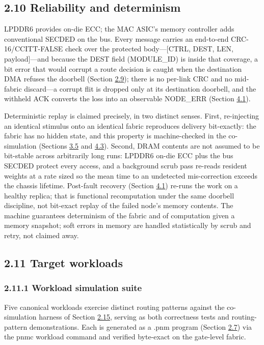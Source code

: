 \documentclass[10pt,twocolumn]{article}
\begin{document}
\subsection*{2.10 Reliability and determinism}\label{sec:2.10}

LPDDR6 provides on-die ECC; the MAC ASIC's memory controller adds conventional SECDED on the bus. Every message carries an end-to-end CRC-16/CCITT-FALSE check over the protected body---[CTRL, DEST, LEN, payload]---and because the DEST field (MODULE\_ID) is inside that coverage, a bit error that would corrupt a route decision is caught when the destination DMA refuses the doorbell (Section \hyperref[sec:2.9]{2.9}); there is no per-link CRC and no mid-fabric discard---a corrupt flit is dropped only at its destination doorbell, and the withheld ACK converts the loss into an observable NODE\_ERR (Section \hyperref[sec:4.1]{4.1}).

Deterministic replay is claimed precisely, in two distinct senses. First, re-injecting an identical stimulus onto an identical fabric reproduces delivery bit-exactly: the fabric has no hidden state, and this property is machine-checked in the co-simulation (Sections \hyperref[sec:3.5]{3.5} and \hyperref[sec:4.3]{4.3}). Second, DRAM contents are not assumed to be bit-stable across arbitrarily long runs: LPDDR6 on-die ECC plus the bus SECDED protect every access, and a background scrub pass re-reads resident weights at a rate sized so the mean time to an undetected mis-correction exceeds the chassis lifetime. Post-fault recovery (Section \hyperref[sec:4.1]{4.1}) re-runs the work on a healthy replica; that is functional recomputation under the same doorbell discipline, not bit-exact replay of the failed node's memory contents. The machine guarantees determinism of the fabric and of computation given a memory snapshot; soft errors in memory are handled statistically by scrub and retry, not claimed away.

\subsection*{2.11 Target workloads}\label{sec:2.11}

\subsubsection*{2.11.1 Workload simulation suite}\label{sec:2.11.1}

Five canonical workloads exercise distinct routing patterns against the co-simulation harness of Section \hyperref[sec:2.15]{2.15}, serving as both correctness tests and routing-pattern demonstrations. Each is generated as a .pnm program (Section \hyperref[sec:2.7]{2.7}) via the pnmc workload command and verified byte-exact on the gate-level fabric.
\end{document}
